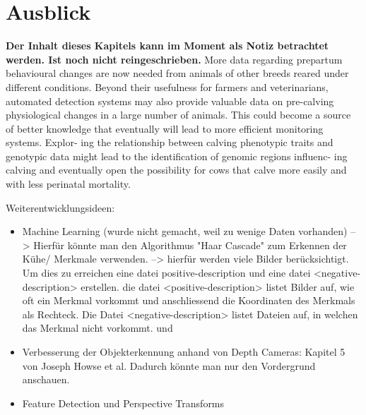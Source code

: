 

\chapter{Ausblick}

\textbf{Der Inhalt dieses Kapitels kann im Moment als Notiz betrachtet werden. Ist noch nicht reingeschrieben.} \newline
More data regarding prepartum behavioural changes are now needed from animals of other breeds reared under different conditions. Beyond their usefulness for farmers and veterinarians, automated detection systems may also provide valuable data on pre-calving physiological changes in a large number of animals. This could become a source of better knowledge that eventually will lead to more efficient monitoring systems. Explor- ing the relationship between calving phenotypic traits and genotypic data might lead to the identification of genomic regions influenc- ing calving and eventually open the possibility for cows that calve more easily and with less perinatal mortality. \cite{Saint-Dizier2015}

Weiterentwicklungsideen: 
\begin{itemize}
	\item Machine Learning (wurde nicht gemacht, weil zu wenige Daten vorhanden) --> Hierfür könnte man den Algorithmus "Haar Cascade" zum Erkennen der Kühe/ Merkmale verwenden. --> hierfür werden viele Bilder berücksichtigt. Um dies zu erreichen eine datei positive-description und eine datei <negative-description> erstellen. die datei <positive-description> listet Bilder auf, wie oft ein Merkmal vorkommt und anschliessend die Koordinaten des Merkmals als Rechteck. Die Datei <negative-description> listet Dateien auf, in welchen das Merkmal nicht vorkommt. \citep[S. 75 ff. ]{Howse2016} und \citep[S. 139 ff. ]{Howse2016}
	\item Verbesserung der Objekterkennung anhand von Depth Cameras: Kapitel 5 von Joseph Howse et al. Dadurch könnte man nur den Vordergrund anschauen. \citep[S. 91 ff. ]{Howse2016}
	\item Feature Detection und Perspective Transforms \citep[S. 385 ff. ]{Howse2016}
\end{itemize}